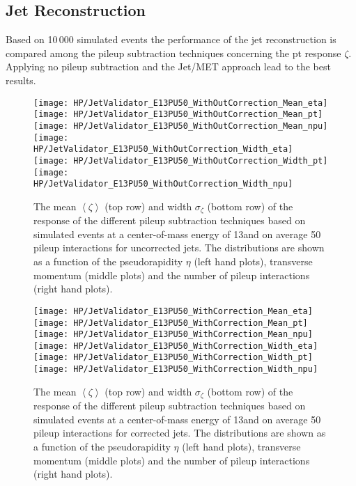 \subsection{Jet Reconstruction \label{sec:HPUAppE13PU50JR}}

Based on 10\,000 simulated \ttbar events the performance of the jet reconstruction is compared among the pileup subtraction techniques concerning the pt response $\zeta$. Applying no pileup subtraction and the Jet/MET approach lead to the best results. 

\begin{figure}[h!h]
  \centering
  \texttt{[image: HP/JetValidator\_E13PU50\_WithOutCorrection\_Mean\_eta]}
  \texttt{[image: HP/JetValidator\_E13PU50\_WithOutCorrection\_Mean\_pt]}
  \texttt{[image: HP/JetValidator\_E13PU50\_WithOutCorrection\_Mean\_npu]}
  \\
  \texttt{[image: HP/JetValidator\_E13PU50\_WithOutCorrection\_Width\_eta]}
  \texttt{[image: HP/JetValidator\_E13PU50\_WithOutCorrection\_Width\_pt]}
  \texttt{[image: HP/JetValidator\_E13PU50\_WithOutCorrection\_Width\_npu]}
  \caption[Mean and width of the \pt{} response of different pileup subtraction techniques based on simulated \ttbar events with 13\TeV and $\left<PU\right>=50$ for uncorrected jets]{The mean $\left<\zeta\right>$ (top row) and width $\sigma_{\zeta}$ (bottom row) of the \pt{} response of the  different pileup subtraction techniques based on simulated \ttbar events at a center-of-mass energy of 13\TeV and on average 50 pileup interactions for uncorrected jets. The distributions are shown as a function of the pseudorapidity $\eta$ (left hand plots), transverse momentum (middle plots) and the number of pileup interactions (right hand plots).}
\end{figure}

\begin{figure}[h!h]
  \centering
  \texttt{[image: HP/JetValidator\_E13PU50\_WithCorrection\_Mean\_eta]}
  \texttt{[image: HP/JetValidator\_E13PU50\_WithCorrection\_Mean\_pt]}
  \texttt{[image: HP/JetValidator\_E13PU50\_WithCorrection\_Mean\_npu]}
  \\
  \texttt{[image: HP/JetValidator\_E13PU50\_WithCorrection\_Width\_eta]}
  \texttt{[image: HP/JetValidator\_E13PU50\_WithCorrection\_Width\_pt]}
  \texttt{[image: HP/JetValidator\_E13PU50\_WithCorrection\_Width\_npu]}
  \caption[Mean and width of the \pt{} response of different pileup subtraction techniques based on simulated \ttbar events with 13\TeV and $\left<PU\right>=50$ for corrected jets]{The mean $\left<\zeta\right>$ (top row) and width $\sigma_{\zeta}$ (bottom row) of the \pt{} response of the different pileup subtraction techniques based on simulated \ttbar events at a center-of-mass energy of 13\TeV and on average 50 pileup interactions for corrected jets. The distributions are shown as a function of the pseudorapidity $\eta$ (left hand plots), transverse momentum (middle plots) and the number of pileup interactions (right hand plots).}
\end{figure}
\clearpage

